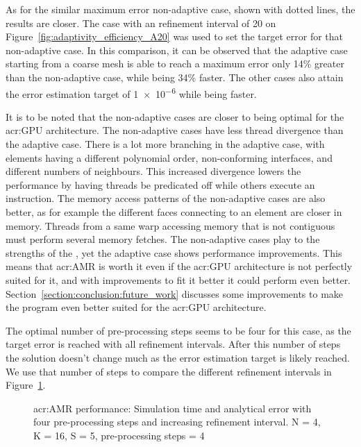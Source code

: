 As for the similar maximum error non-adaptive case, shown with dotted lines, the results are closer.
The case with an refinement interval of 20 on Figure~\ref{fig:adaptivity_efficiency_A20} was used to
set the target error for that non-adaptive case. In this comparison, it can be observed that the
adaptive case starting from a coarse mesh is able to reach a maximum error only 14\% greater than
the non-adaptive case, while being 34\% faster. The other cases also attain the error estimation
target of \num{1e-6} while being faster.

It is to be noted that the non-adaptive cases are closer to being optimal for the \acrshort{acr:GPU}
architecture. The non-adaptive cases have less thread divergence than the adaptive case. There is a
lot more branching in the adaptive case, with elements having a different polynomial order,
non-conforming interfaces, and different numbers of neighbours. This increased divergence lowers the
performance by having threads be predicated off while others execute an instruction. The memory
access patterns of the non-adaptive cases are also better, as for example the different faces
connecting to an element are closer in memory. Threads from a same warp accessing memory that is not
contiguous must perform several memory fetches. The non-adaptive cases play to the strengths of the
, yet the adaptive case shows performance improvements. This means that
\acrshort{acr:AMR} is worth it even if the \acrshort{acr:GPU} architecture is not perfectly suited
for it, and with improvements to fit it better it could perform even better.
Section~\ref{section:conclusion:future_work} discusses some improvements to make the program even
better suited for the \acrshort{acr:GPU} architecture.

The optimal number of pre-processing steps seems to be four for this case, as the target error is
reached with all refinement intervals. After this number of steps the solution doesn't change much
as the error estimation target is likely reached. We use that number of steps to compare the
different refinement intervals in Figure~\ref{fig:adaptivity_efficiency_C4}.

\begin{figure}[H]
	\centering
	\hfill
	\caption{\Acrlong{acr:AMR} performance: Simulation time and analytical error with four pre-processing steps and increasing refinement interval. N = 4, K = 16, S = 5, pre-processing steps = 4}\label{fig:adaptivity_efficiency_C4}
\end{figure}

